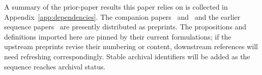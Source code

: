 A summary of the prior-paper results this paper relies on is
collected in Appendix~\ref{app:dependencies}.  The companion
papers~\citep[Revealed~Sacrifice]{lasser2026paper8a}
and~\citep[Need~Sufficiency]{lasser2026paper8b} and the earlier
sequence papers~\citep{lasser2026gfm,lasser2026poset,lasser2026horizon,lasser2026scm,lasser2026exo,lasser2026phase,lasser2026wamura}
are presently distributed as preprints.  The propositions and
definitions imported here are pinned by their current
formulations; if the upstream preprints revise their numbering
or content, downstream references will need refreshing
correspondingly.  Stable archival identifiers will be added as
the sequence reaches archival status.
